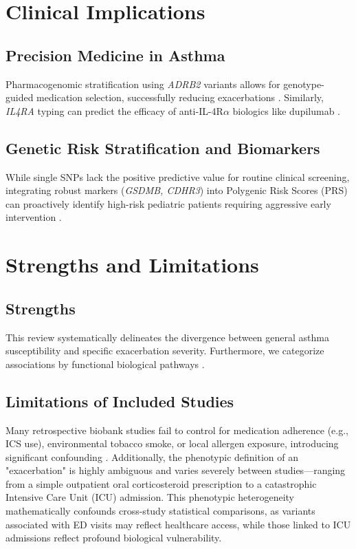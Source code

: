 \documentclass[11pt,a4paper]{article}
\begin{document}
\section{Clinical Implications}

\subsection{Precision Medicine in Asthma}
Pharmacogenomic stratification using \textit{ADRB2} variants allows for genotype-guided medication selection, successfully reducing exacerbations \cite{SlobVijverberg2024}. Similarly, \textit{IL4RA} typing can predict the efficacy of anti-IL-4R$\alpha$ biologics like dupilumab \cite{BuchheitSohail2022}.

\subsection{Genetic Risk Stratification and Biomarkers}
While single SNPs lack the positive predictive value for routine clinical screening, integrating robust markers (\textit{GSDMB, CDHR3}) into Polygenic Risk Scores (PRS) can proactively identify high-risk pediatric patients requiring aggressive early intervention \cite{DapasWentworthSheilds2025}.

\section{Strengths and Limitations}

\subsection{Strengths}
This review systematically delineates the divergence between general asthma susceptibility and specific exacerbation severity. Furthermore, we categorize associations by functional biological pathways \cite{PortelliRakkar2021}.

\subsection{Limitations of Included Studies}
Many retrospective biobank studies fail to control for medication adherence (e.g., ICS use), environmental tobacco smoke, or local allergen exposure, introducing significant confounding \cite{ChaChoi2023, ShukurAlyaqubi2021}. Additionally, the phenotypic definition of an "exacerbation" is highly ambiguous and varies severely between studies—ranging from a simple outpatient oral corticosteroid prescription to a catastrophic Intensive Care Unit (ICU) admission. This phenotypic heterogeneity mathematically confounds cross-study statistical comparisons, as variants associated with ED visits may reflect healthcare access, while those linked to ICU admissions reflect profound biological vulnerability.
\end{document}
